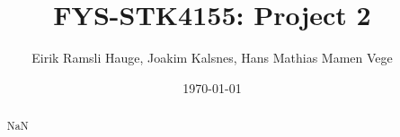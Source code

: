 \documentclass[11pt]{article}
\title{FYS-STK4155: Project 2}
\author{Eirik Ramsli Hauge, Joakim Kalsnes, Hans Mathias Mamen Vege}
\date{\today}
\begin{document}
\maketitle

\begin{abstract}
NaN
\end{abstract}


















\end{document}
